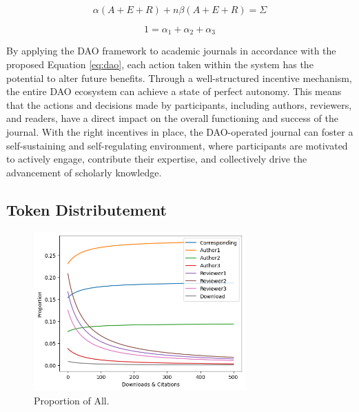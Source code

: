 \documentclass[lettersize,journal]{IEEEtran}
\begin{document}
\begin{equation}
  \alpha (A + E + R)  + n\beta (A + E + R) = \Sigma
\end{equation}

\begin{equation}
  1 = \alpha_1 + \alpha_2 + \alpha_3
\end{equation}

By applying the DAO framework to academic journals in accordance with the proposed Equation \ref{eq:dao}, each action taken within the system has the potential to alter future benefits. Through a well-structured incentive mechanism, the entire DAO ecosystem can achieve a state of perfect autonomy. This means that the actions and decisions made by participants, including authors, reviewers, and readers, have a direct impact on the overall functioning and success of the journal. With the right incentives in place, the DAO-operated journal can foster a self-sustaining and self-regulating environment, where participants are motivated to actively engage, contribute their expertise, and collectively drive the advancement of scholarly knowledge.


\subsection{Token Distributement}

\begin{figure}[h]
  \centering
  \includegraphics[width=3.2in]{assets/proportion-all.png}
  \caption{Proportion of All.}
  \label{fig:proportion-all}
\end{figure}
\end{document}
